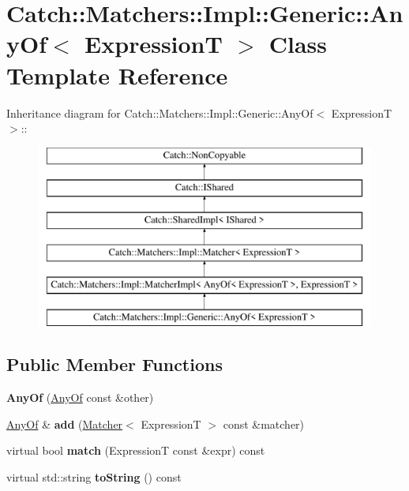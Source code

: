 \hypertarget{classCatch_1_1Matchers_1_1Impl_1_1Generic_1_1AnyOf}{
\section{Catch::Matchers::Impl::Generic::AnyOf$<$ ExpressionT $>$ Class Template Reference}
\label{classCatch_1_1Matchers_1_1Impl_1_1Generic_1_1AnyOf}
}
Inheritance diagram for Catch::Matchers::Impl::Generic::AnyOf$<$ ExpressionT $>$::\begin{figure}[H]
\begin{center}
\leavevmode
\includegraphics[height=6cm]{classCatch_1_1Matchers_1_1Impl_1_1Generic_1_1AnyOf}
\end{center}
\end{figure}
\subsection*{Public Member Functions}
\begin{DoxyCompactItemize}
\item 
\hypertarget{classCatch_1_1Matchers_1_1Impl_1_1Generic_1_1AnyOf_a74fbc05b32d334fcbfd0fae0163a404e}{
{\bfseries AnyOf} (\hyperlink{classCatch_1_1Matchers_1_1Impl_1_1Generic_1_1AnyOf}{AnyOf} const \&other)}
\label{classCatch_1_1Matchers_1_1Impl_1_1Generic_1_1AnyOf_a74fbc05b32d334fcbfd0fae0163a404e}

\item 
\hypertarget{classCatch_1_1Matchers_1_1Impl_1_1Generic_1_1AnyOf_a3bce94b627551e5f96c5f9c6060413f0}{
\hyperlink{classCatch_1_1Matchers_1_1Impl_1_1Generic_1_1AnyOf}{AnyOf} \& {\bfseries add} (\hyperlink{structCatch_1_1Matchers_1_1Impl_1_1Matcher}{Matcher}$<$ ExpressionT $>$ const \&matcher)}
\label{classCatch_1_1Matchers_1_1Impl_1_1Generic_1_1AnyOf_a3bce94b627551e5f96c5f9c6060413f0}

\item 
\hypertarget{classCatch_1_1Matchers_1_1Impl_1_1Generic_1_1AnyOf_a2f97a08338e12deba541043a57d73db9}{
virtual bool {\bfseries match} (ExpressionT const \&expr) const }
\label{classCatch_1_1Matchers_1_1Impl_1_1Generic_1_1AnyOf_a2f97a08338e12deba541043a57d73db9}

\item 
\hypertarget{classCatch_1_1Matchers_1_1Impl_1_1Generic_1_1AnyOf_a7ecc6ec08b2018a643923a9d450aa328}{
virtual std::string {\bfseries toString} () const }
\label{classCatch_1_1Matchers_1_1Impl_1_1Generic_1_1AnyOf_a7ecc6ec08b2018a643923a9d450aa328}

\end{DoxyCompactItemize}
